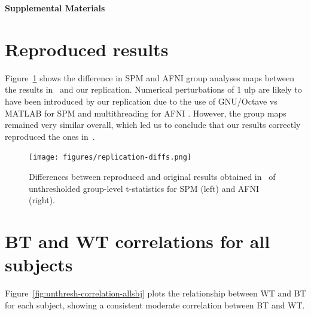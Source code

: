 \documentclass[11pt,onecolumn]{article}
\begin{document}
\clearpage

\setcounter{equation}{0}
\setcounter{figure}{0}
\setcounter{table}{0}
\setcounter{section}{0}

\makeatletter
\renewcommand{\theequation}{S\arabic{equation}}
\renewcommand{\thefigure}{S\arabic{figure}}
\renewcommand{\thesection}{S\arabic{section}}

\textbf{\centering \Large Supplemental Materials}

\section{Reproduced results}
\label{sec:supp-repro}

Figure~\ref{fig:replication-diff} shows the difference in SPM and AFNI
group analyses maps between the results in~\cite{bowring2019exploring} and
our replication. Numerical perturbations of 1 ulp are likely to have been
introduced by our replication due to the use of GNU/Octave vs MATLAB for SPM
and multithreading for AFNI . However, the group maps remained very similar
overall, which led us to conclude that our results correctly reproduced
the ones in~\cite{bowring2019exploring}.
\begin{figure}[ht]
  \texttt{[image: figures/replication-diffs.png]}
  \caption{Differences between reproduced and original results obtained in~\cite{bowring2019exploring}
    of unthresholded group-level t-statistics for SPM (left) and AFNI (right). }
  \label{fig:replication-diff}
\end{figure}

\section{BT and WT correlations for all subjects}
\label{sec:supp-subjects}

Figure~\ref{fig:unthresh-correlation-allsbj} plots the relationship between
WT and BT for each subject, showing a consistent moderate correlation between BT and
WT.
\end{document}
